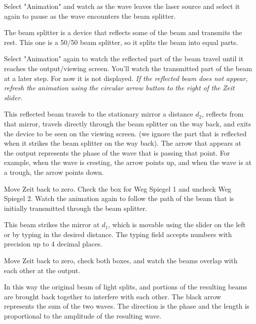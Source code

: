 \begin{steps}
	\item Select "Animation" and watch as the wave leaves the laser source and select it again to pause as the wave encounters the beam splitter.
\end{steps}

The beam splitter is a device that reflects some of the beam and transmits the rest. This one is a 50/50 beam splitter, so it splits the beam into equal parts.

\begin{steps}
	\item Select "Animation" again to watch the reflected part of the beam travel until it reaches the output/viewing screen. You'll watch the transmitted part of the beam at a later step. For now it is not displayed. \textit{If the reflected beam does not appear, refresh the animation using the circular arrow button to the right of the Zeit slider.}
\end{steps}

This reflected beam travels to the stationary mirror a distance $d_2$, reflects from that mirror, travels directly through the beam splitter on the way back, and exits the device to be seen on the viewing screen. (we ignore the part that is reflected when it strikes the beam splitter on the way back). The arrow that appears at the output represents the phase of the wave that is passing that point. For example, when the wave is cresting, the arrow points up, and when the wave is at a trough, the arrow points down.

\begin{steps}
	\item Move Zeit back to zero. Check the box for Weg Spiegel 1 and uncheck Weg Spiegel 2. Watch the animation again to follow the path of the beam that is initially transmitted through the beam splitter.
\end{steps}

This beam strikes the mirror at $d_1$, which is movable using the slider on the left or by typing in the desired distance. The typing field accepts numbers with precision up to 4 decimal places.

\begin{steps}
	\item Move Zeit back to zero, check both boxes, and watch the beams overlap with each other at the output.
\end{steps}

In this way the original beam of light splits, and portions of the resulting beams are brought back together to interfere with each other. The black arrow represents the sum of the two waves. The direction is the phase and the length is proportional to the amplitude of the resulting wave.

